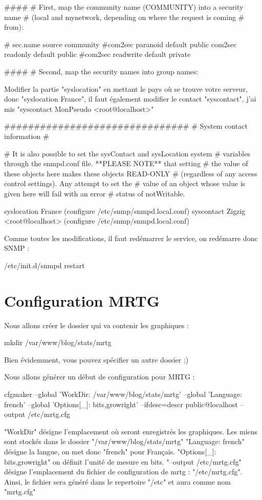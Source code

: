 ####
# First, map the community name (COMMUNITY) into a security name
# (local and mynetwork, depending on where the request is coming
# from):

# sec.name source community
#com2sec paranoid default public
com2sec readonly default public
#com2sec readwrite default private

####
# Second, map the security names into group names:


Modifier la partie "syslocation" en mettant le pays où se trouve votre serveur, donc "syslocation France", il faut également modifier le contact "syscontact", j'ai mis "syscontact MonPseudo <root@localhost>"

###############################
# System contact information
#

# It is also possible to set the sysContact and sysLocation system
# variables through the snmpd.conf file. **PLEASE NOTE** that setting
# the value of these objects here makes these objects READ-ONLY
# (regardless of any access control settings). Any attempt to set the
# value of an object whose value is given here will fail with an error
# status of notWritable.

syslocation France (configure /etc/snmp/snmpd.local.conf)
syscontact Zigzig <root@localhost> (configure /etc/snmp/snmpd.local.conf)


Comme toutes les modifications, il faut redémarrer le service, on redémarre donc SNMP :

/etc/init.d/snmpd restart


\section{Configuration MRTG}

Nous allons créer le dossier qui va contenir les graphiques :

mkdir /var/www/blog/stats/mrtg


Bien évidemment, vous pouvez spécifier un autre dossier ;)

Nous allons générer un début de configuration pour MRTG :

cfgmaker 
--global 'WorkDir: /var/www/blog/stats/mrtg' 
--global 'Language: french' 
--global 'Options[_]: bits,growright' 
--ifdesc=descr public@localhost 
--output /etc/mrtg.cfg


"WorkDir" désigne l'emplacement où seront enregistrés les graphiques. Les miens sont stockés dans le dossier "/var/www/blog/stats/mrtg"
"Language: french" désigne la langue, on met donc "french" pour Français.
"Options[_]: bits,growright" on définit l'unité de mesure en bits.
"--output /etc/mrtg.cfg" désigne l'emplacement du fichier de configuration de mrtg : "/etc/mrtg.cfg". Ainsi, le fichier sera généré dans le repertoire "/etc" et aura comme nom "mrtg.cfg"

